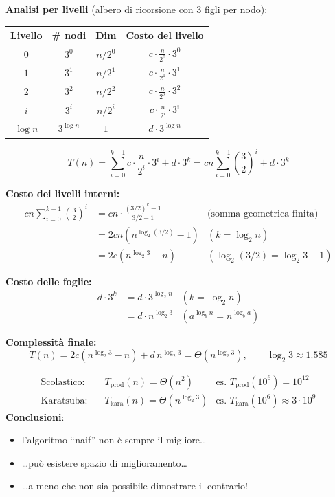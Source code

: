 \documentclass[12pt, a4paper]{article}
\begin{document}
\textbf{Analisi per livelli} (albero di ricorsione con $3$ figli per nodo):
\begin{center}
\begin{tabular}{cccc}
\toprule
\textbf{Livello} & \textbf{\# nodi} & \textbf{Dim} & \textbf{Costo del livello} \\
\midrule
$0$ & $3^0$ & $n/2^0$ & $c\cdot\frac{n}{2^0}\cdot 3^0$ \\
$1$ & $3^1$ & $n/2^1$ & $c\cdot\frac{n}{2^1}\cdot 3^1$ \\
$2$ & $3^2$ & $n/2^2$ & $c\cdot\frac{n}{2^2}\cdot 3^2$ \\
$i$ & $3^i$ & $n/2^i$ & $c\cdot\frac{n}{2^i}\cdot 3^i$ \\
$\log n$ & $3^{\log n}$ & $1$ & $d\cdot 3^{\log n}$ \\
\bottomrule
\end{tabular}
\end{center}
$$T(n) = \sum_{i=0}^{k-1} c\cdot\frac{n}{2^i}\cdot 3^i + d\cdot 3^k = cn\sum_{i=0}^{k-1}\left(\frac{3}{2}\right)^i + d\cdot 3^k$$

\textbf{Costo dei livelli interni:}
\begin{align*}
cn\sum_{i=0}^{k-1}\left(\frac{3}{2}\right)^i &= cn\cdot\frac{(3/2)^k-1}{3/2-1} & \text{(somma geometrica finita)} \\
&= 2cn\left(n^{\log_2(3/2)}-1\right) & (k=\log_2 n) \\
&= 2c\left(n^{\log_2 3}-n\right) & (\log_2(3/2)=\log_2 3-1)
\end{align*}

\textbf{Costo delle foglie:}
\begin{align*}
d\cdot 3^k &= d\cdot 3^{\log_2 n} & (k=\log_2 n) \\
&= d\cdot n^{\log_2 3} & (a^{\log_b n}=n^{\log_b a})
\end{align*}

\textbf{Complessità finale:}
$$T(n) = 2c\left(n^{\log_2 3}-n\right) + d\,n^{\log_2 3} = \Theta\!\left(n^{\log_2 3}\right), \qquad \log_2 3 \approx 1.585$$

\begin{tcolorbox}[colback=lightergray!10, colframe=tocsec, title=\textbf{Confronto della Complessità Computazionale}]
\begin{align*}
\text{Scolastico:}\quad & T_{\text{prod}}(n)=\Theta(n^2) & \text{es. } T_{\text{prod}}(10^6)=10^{12} \\
\text{Karatsuba:}\quad & T_{\text{kara}}(n)=\Theta(n^{\log_2 3}) & \text{es. } T_{\text{kara}}(10^6)\approx 3\cdot 10^{9}
\end{align*}
\textbf{Conclusioni}:
\begin{itemize}
    \item l'algoritmo ``naif'' non è sempre il migliore\ldots
    \item \ldots può esistere spazio di miglioramento\ldots
    \item \ldots a meno che non sia possibile dimostrare il contrario!
\end{itemize}
\end{tcolorbox}
\end{document}
